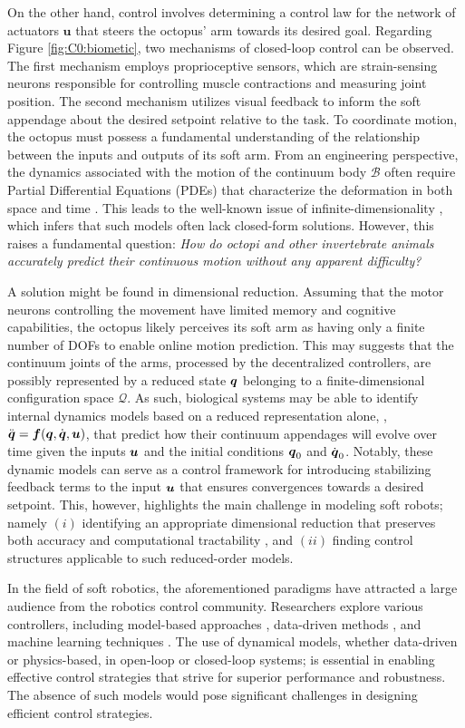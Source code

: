 On the other hand, control involves determining a control law for the network of actuators $\textbf{u}$ that steers the octopus' arm towards its desired goal. Regarding Figure \ref{fig:C0:biometic}, two mechanisms of closed-loop control can be observed. The first mechanism employs proprioceptive sensors, which are strain-sensing neurons responsible for controlling muscle contractions and measuring joint position. The second mechanism utilizes visual feedback to inform the soft appendage about the desired setpoint relative to the task. To coordinate motion, the octopus must possess a fundamental understanding of the relationship between the inputs and outputs of its soft arm. From an engineering perspective, the dynamics associated with the motion of the continuum body $\mathcal{B}$ often require Partial Differential Equations (PDEs) that characterize the deformation in both space and time \cite{Armanini2023,DellaSantina2021,Rus2015}. This leads to the well-known issue of infinite-dimensionality \cite{DellaSantina2020,Holzapfel2002,Mochiyama1992}, which infers that such models often lack closed-form solutions. However, this raises a fundamental question: \emph{How do octopi and other invertebrate animals accurately predict their continuous motion without any apparent difficulty?} 

A solution might be found in dimensional reduction. Assuming that the motor neurons controlling the movement have limited memory and cognitive capabilities, the octopus likely perceives its soft arm as having only a finite number of DOFs to enable online motion prediction. This may suggests that the continuum joints of the arms, processed by the decentralized controllers, are possibly represented by a reduced state ${\boldsymbol{q}}$ belonging to a finite-dimensional configuration space $\mathcal{Q}$. As such, biological systems may be able to identify internal dynamics models based on a reduced representation alone, \eg, ${\ddot{\boldsymbol{q}}} = {\boldsymbol{f}}({\boldsymbol{q}},{\dot{\boldsymbol{q}}},{\boldsymbol{u}})$, that predict how their continuum appendages will evolve over time given the inputs ${\boldsymbol{u}}$ and the initial conditions ${\boldsymbol{q}}_0$ and ${\dot{\boldsymbol{q}}}_0$. Notably, these dynamic models can serve as a control framework for introducing stabilizing feedback terms to the input ${\boldsymbol{u}}$ that ensures convergences towards a desired setpoint. This, however, highlights the main challenge in modeling soft robots; namely $(i)$ identifying an appropriate dimensional reduction that preserves both accuracy and computational tractability \cite{DellaSantina2021}, and $(ii)$ finding control structures applicable to such reduced-order models.

In the field of soft robotics, the aforementioned paradigms have attracted a large audience from the robotics control community. Researchers explore various controllers, including model-based approaches \cite{Armanini2023,DellaSantina2021,Milana2021,Franco2020}, data-driven methods \cite{Bruder2019,Alora2022}, and machine learning techniques \cite{Thuruthel2017Oct,Thuruthel2018Nov,Kim2021Feb,Schegg2022}. The use of dynamical models, whether data-driven or physics-based, in open-loop or closed-loop systems; is essential in enabling effective control strategies that strive for superior performance and robustness. The absence of such models would pose significant challenges in designing efficient control strategies.
